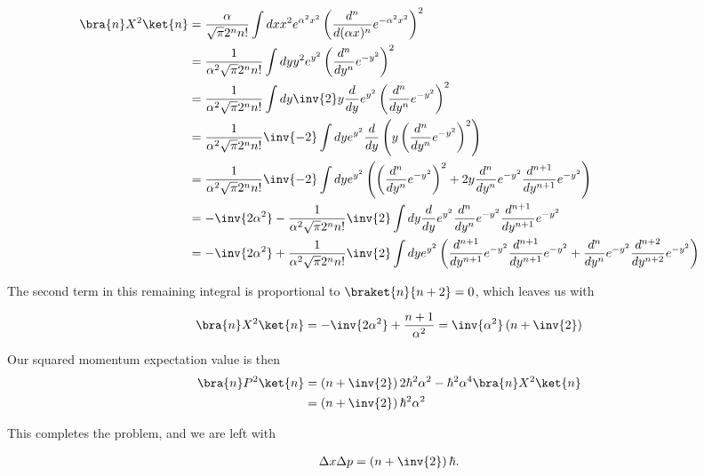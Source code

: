 \begin{align*}
\bra{n} X^2 \ket{n}
&=
\frac{ \alpha}{\sqrt{\pi} 2^n n!} 
\int dx x^2
e^{ \alpha^2 x^2}
\left(
\frac{d^n}{d (\alpha x)^n}
e^{ -\alpha^2 x^2}
\right)^2 \\
&=
\frac{ 1 }{\alpha^2 \sqrt{\pi} 2^n n!} 
\int dy y^2 
e^{ y^2}
\left(
\frac{d^n}{d y^n}
e^{ -y^2 }
\right)^2 \\
&=
\frac{ 1 }{\alpha^2 \sqrt{\pi} 2^n n!} 
\int dy \inv{2} y \frac{ d}{dy} e^{ y^2}
\left(
\frac{d^n}{d y^n}
e^{ -y^2 }
\right)^2 \\
&=
\frac{ 1 }{\alpha^2 \sqrt{\pi} 2^n n!} 
\inv{-2}
\int dy e^{ y^2}
\frac{d}{dy} \left( 
y 
\left(
\frac{d^n}{d y^n}
e^{ -y^2 }
\right)^2 
\right)
\\
&=
\frac{ 1 }{\alpha^2 \sqrt{\pi} 2^n n!} 
\inv{-2}
\int dy e^{ y^2}
\left( 
\left(
\frac{d^n}{d y^n}
e^{ -y^2 }
\right)^2 
+ 2 y 
\frac{d^n}{d y^n}
e^{ -y^2 }
\frac{d^{n+1}}{d y^{n+1}}
e^{ -y^2 }
\right)
\\
&=
-\inv{2 \alpha^2}
-
\frac{ 1 }{\alpha^2 \sqrt{\pi} 2^n n!} 
\inv{2}
\int dy \frac{d}{dy} e^{ y^2}
\frac{d^n}{d y^n}
e^{ -y^2 }
\frac{d^{n+1}}{d y^{n+1}}
e^{ -y^2 }
\\
&=
-\inv{2 \alpha^2}
+
\frac{ 1 }{\alpha^2 \sqrt{\pi} 2^n n!} 
\inv{2}
\int dy 
e^{ y^2}
\left(
\frac{d^{n+1}}{d y^{n+1}}
e^{ -y^2 }
\frac{d^{n+1}}{d y^{n+1}}
e^{ -y^2 }
+
\frac{d^n}{d y^n}
e^{ -y^2 }
\frac{d^{n+2}}{d y^{n+2}}
e^{ -y^2 }
\right)
\\
\end{align*}

The second term in this remaining integral is proportional to $\braket{n}{n+2} = 0$, which leaves us with

\begin{align}\label{eqn:desaiCh9:310}
\bra{n} X^2 \ket{n}
=
-\inv{2 \alpha^2} + \frac{n+1}{\alpha^2} = \inv{\alpha^2}\left( n + \inv{2} \right)
\end{align}

Our squared momentum expectation value is then
\begin{align*}
\bra{n} P^2 \ket{n}
&=
\left( n + \inv{2} \right) 2 \hbar^2 \alpha^2 
- \hbar^2 \alpha^4 \bra{n} X^2 \ket{n} \\
&=
\left( n + \inv{2} \right) \hbar^2 \alpha^2 
\end{align*}

This completes the problem, and we are left with

\begin{align}\label{eqn:desaiCh9:320}
\Delta x \Delta p = \left( n + \inv{2} \right) \hbar.
\end{align}

